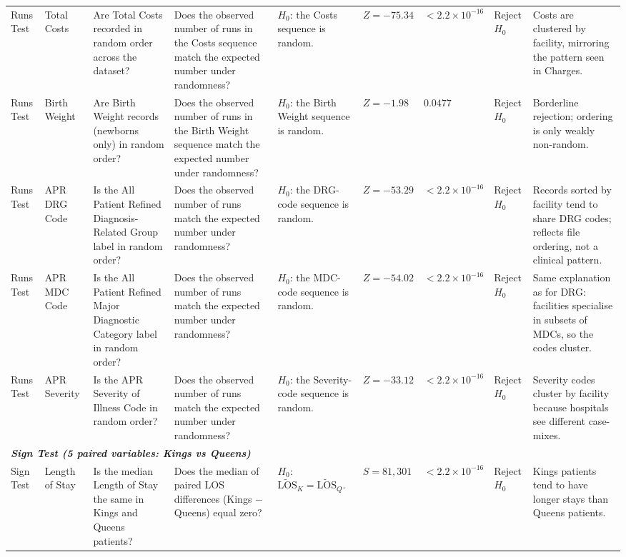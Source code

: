 \documentclass[12pt]{article}
\begin{document}
\begin{landscape}
\begin{scriptsize}
\begin{longtable}{p{2.0cm} p{2.4cm} p{3.0cm} p{2.7cm} p{2.5cm} p{1.7cm} p{1.3cm} p{1.3cm} p{3.0cm}}
Runs Test & Total Costs & Are Total Costs recorded in random order across the dataset? & Does the observed number of runs in the Costs sequence match the expected number under randomness? & $H_0$: the Costs sequence is random. & $Z = -75.34$ & $< 2.2 \times 10^{-16}$ & Reject $H_0$ & Costs are clustered by facility, mirroring the pattern seen in Charges. \\

Runs Test & Birth Weight & Are Birth Weight records (newborns only) in random order? & Does the observed number of runs in the Birth Weight sequence match the expected number under randomness? & $H_0$: the Birth Weight sequence is random. & $Z = -1.98$ & $0.0477$ & Reject $H_0$ & Borderline rejection; ordering is only weakly non-random. \\

Runs Test & APR DRG Code & Is the All Patient Refined Diagnosis-Related Group label in random order? & Does the observed number of runs match the expected number under randomness? & $H_0$: the DRG-code sequence is random. & $Z = -53.29$ & $< 2.2 \times 10^{-16}$ & Reject $H_0$ & Records sorted by facility tend to share DRG codes; reflects file ordering, not a clinical pattern. \\

Runs Test & APR MDC Code & Is the All Patient Refined Major Diagnostic Category label in random order? & Does the observed number of runs match the expected number under randomness? & $H_0$: the MDC-code sequence is random. & $Z = -54.02$ & $< 2.2 \times 10^{-16}$ & Reject $H_0$ & Same explanation as for DRG: facilities specialise in subsets of MDCs, so the codes cluster. \\

Runs Test & APR Severity & Is the APR Severity of Illness Code in random order? & Does the observed number of runs match the expected number under randomness? & $H_0$: the Severity-code sequence is random. & $Z = -33.12$ & $< 2.2 \times 10^{-16}$ & Reject $H_0$ & Severity codes cluster by facility because hospitals see different case-mixes. \\

\midrule
\multicolumn{9}{l}{\textit{\textbf{Sign Test (5 paired variables: Kings vs Queens)}}} \\

Sign Test & Length of Stay & Is the median Length of Stay the same in Kings and Queens patients? & Does the median of paired LOS differences (Kings $-$ Queens) equal zero? & $H_0$: $\widetilde{\mathrm{LOS}}_K = \widetilde{\mathrm{LOS}}_Q$. & $S = 81{,}301$ & $< 2.2 \times 10^{-16}$ & Reject $H_0$ & Kings patients tend to have longer stays than Queens patients. \\


\end{longtable}
\end{scriptsize}
\end{landscape}
\end{document}
